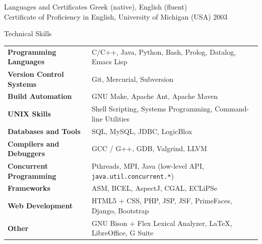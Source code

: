 \documentclass{resume}
\begin{document}
\begin{rSection}{Languages and Certificates}
  Greek (native), English (fluent) \\
  Certificate of Proficiency in English, University of Michigan (USA)
  \hfill 2003
\end{rSection}

\newpage


\begin{rSection}{Technical Skills}

{\renewcommand{\arraystretch}{1.3}
\begin{tabular}{ @{} >{\bfseries}l @{\hspace{6ex}} l }

Programming Languages
   & C/C++, Java, Python, Bash, Prolog, Datalog, Emacs Lisp \\

Version Control Systems
   & Git, Mercurial, Subversion \\

Build Automation
   & GNU Make, Apache Ant, Apache Maven \\

UNIX Skills
   & Shell Scripting, Systems Programming, Command-line Utilities \\

Databases and Tools
   & SQL, MySQL, JDBC, LogicBlox \\

Compilers and Debuggers
   & GCC / G++, GDB, Valgrind, LLVM \\

Concurrent Programming
   & Pthreads, MPI, Java (low-level API, \texttt{java.util.concurrent.*}) \\

Frameworks
   & ASM, BCEL, AspectJ, CGAL, ECLiPSe \\

Web Development
   & HTML5 + CSS, PHP, JSP, JSF, PrimeFaces, Django, Bootstrap \\

Other
   & GNU Bison + Flex Lexical Analyzer, \LaTeX{}, LibreOffice, G Suite \\
\end{tabular}}
\end{rSection}

\end{document}
